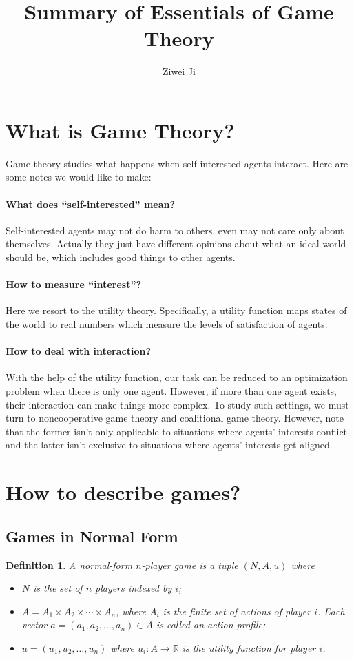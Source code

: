 \documentclass{article}
\title{Summary of Essentials of Game Theory}
\author{Ziwei Ji}
\newtheorem{definition}{Definition}
\begin{document}
\maketitle

\section{What is Game Theory?}
Game theory studies what happens when self-interested agents interact. Here are some notes we would like to make:
\paragraph{What does ``self-interested'' mean?}
Self-interested agents may not do harm to others, even may not care only about themselves. Actually they just have different opinions about what an ideal world should be, which includes good things to other agents.

\paragraph{How to measure ``interest''?}
Here we resort to the utility theory. Specifically, a utility function maps states of the world to real numbers which measure the levels of satisfaction of agents.

\paragraph{How to deal with interaction?}
With the help of the utility function, our task can be reduced to an optimization problem when there is only one agent. However, if more than one agent exists, their interaction can make things more complex. To study such settings, we must turn to noncooperative game theory and coalitional game theory. However, note that the former isn't only applicable to situations where agents' interests conflict and the latter isn't exclusive to situations where agents' interests get aligned.

\section{How to describe games?}
\subsection{Games in Normal Form}
\begin{definition}
A normal-form $n$-player game is a tuple $(N,A,u)$ where
\begin{itemize}
\item $N$ is the set of $n$ players indexed by $i$;
\item $A=A_1\times A_2\times\cdots\times A_n$, where $A_i$ is the finite set of actions of player $i$. Each vector $a=(a_1,a_2,\ldots,a_n)\in A$ is called an action profile;
\item $u=(u_1,u_2,\ldots,u_n)$ where $u_i:A\rightarrow\mathbb{R}$ is the utility function for player $i$.
\end{itemize}
\end{definition}
\end{document}
